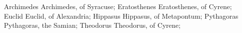 \DefFriend Archimedes       Archimedes, of Syracuse;
\DefFriend Eratosthenes     Eratosthenes, of Cyrene; %
\DefFriend Euclid           Euclid, of Alexandria;
\DefFriend Hippasus         Hippasus, of Metapontum; %
\DefFriend Pythagoras       Pythagoras, the Samian; %
\DefFriend Theodorus        Theodorus, of Cyrene; %
